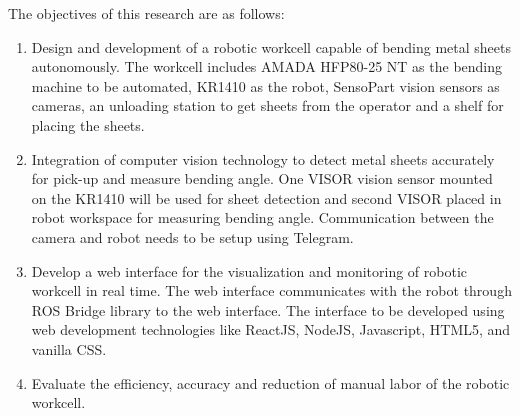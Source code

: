The objectives of this research are as follows:
\begin{enumerate}
    \item Design and development of a robotic workcell capable of bending metal sheets autonomously. The workcell includes AMADA HFP80-25 NT as the bending machine to be automated, KR1410 as the robot, SensoPart vision sensors as cameras, an unloading station to get sheets from the operator and a shelf for placing the sheets.
    \item Integration of computer vision technology to detect metal sheets accurately for pick-up and measure bending angle. One VISOR\textsuperscript{\textregistered} vision sensor mounted on the KR1410 will be used for sheet detection and second VISOR\textsuperscript{\textregistered} placed in robot workspace for measuring bending angle. Communication between the camera and robot needs to be setup using Telegram.
    \item Develop a web interface for the visualization and monitoring of robotic workcell in real time. The web interface communicates with the robot through ROS Bridge library to the web interface. The interface to be developed using web development technologies like ReactJS, NodeJS, Javascript, HTML5, and vanilla CSS.
    \item Evaluate the efficiency, accuracy and reduction of manual labor of the robotic workcell.
\end{enumerate}
